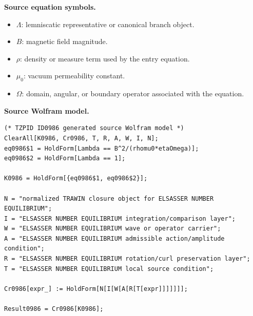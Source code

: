 \begin{minipage}[t]{0.49\linewidth}
\begingroup
\small
\raggedright
\textbf{Source equation symbols.}\par
\begin{itemize}[leftmargin=1.35em,itemsep=1pt,topsep=1pt,parsep=0pt]
    \item $\Lambda$: lemniscatic representative or canonical branch object.
    \item $B$: magnetic field magnitude.
    \item $\rho$: density or measure term used by the entry equation.
    \item $\mu_0$: vacuum permeability constant.
    \item $\Omega$: domain, angular, or boundary operator associated with the equation.
\end{itemize}
\endgroup
\end{minipage}\hfill
\begin{minipage}[t]{0.47\linewidth}
\begingroup
\scriptsize
\raggedright
\textbf{Source Wolfram model.}\par
\begin{Verbatim}[fontsize=\tiny,breaklines=true,breakanywhere=true]
(* TZPID ID0986 generated source Wolfram model *)
ClearAll[K0986, Cr0986, T, R, A, W, I, N];
eq0986$1 = HoldForm[Lambda == B^2/(rhomu0*etaOmega)];
eq0986$2 = HoldForm[Lambda == 1];

K0986 = HoldForm[{eq0986$1, eq0986$2}];

N = "normalized TRAWIN closure object for ELSASSER NUMBER EQUILIBRIUM";
I = "ELSASSER NUMBER EQUILIBRIUM integration/comparison layer";
W = "ELSASSER NUMBER EQUILIBRIUM wave or operator carrier";
A = "ELSASSER NUMBER EQUILIBRIUM admissible action/amplitude condition";
R = "ELSASSER NUMBER EQUILIBRIUM rotation/curl preservation layer";
T = "ELSASSER NUMBER EQUILIBRIUM local source condition";

Cr0986[expr_] := HoldForm[N[I[W[A[R[T[expr]]]]]]];

Result0986 = Cr0986[K0986];
\end{Verbatim}
\endgroup
\end{minipage}

